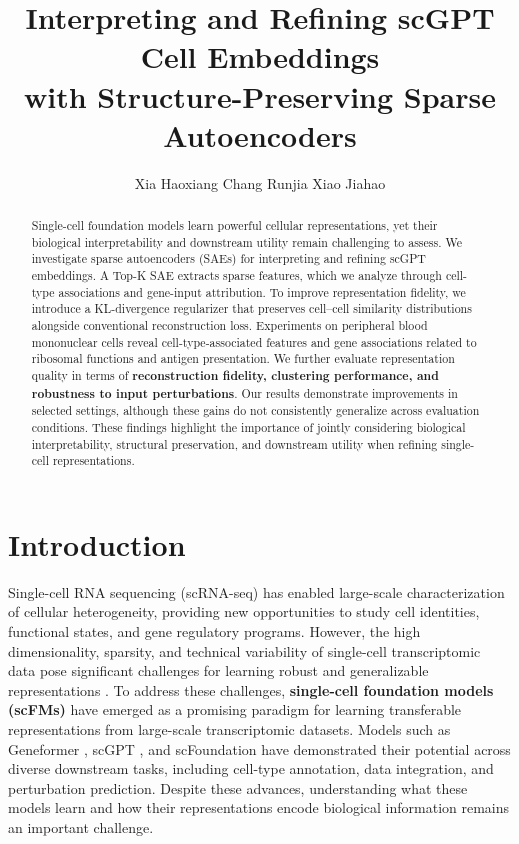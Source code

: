 \documentclass{article}
\title{Interpreting and Refining scGPT Cell Embeddings\\
with Structure-Preserving Sparse Autoencoders}
\author{Xia Haoxiang \And Chang Runjia \And Xiao Jiahao}
\begin{document}
\maketitle
\thispagestyle{plain}

\begin{abstract}
Single-cell foundation models learn powerful cellular representations, yet their biological interpretability and downstream utility remain challenging to assess. We investigate sparse autoencoders (SAEs) for interpreting and refining scGPT embeddings. A Top-K SAE extracts sparse features, which we analyze through cell-type associations and gene-input attribution. To improve representation fidelity, we introduce a KL-divergence regularizer that preserves cell--cell similarity distributions alongside conventional reconstruction loss. Experiments on peripheral blood mononuclear cells reveal cell-type-associated features and gene associations related to ribosomal functions and antigen presentation. We further evaluate representation quality in terms of \textbf{reconstruction fidelity, clustering performance, and robustness to input perturbations}. Our results demonstrate improvements in selected settings, although these gains do not consistently generalize across evaluation conditions. These findings highlight the importance of jointly considering biological interpretability, structural preservation, and downstream utility when refining single-cell representations.
\end{abstract}

\section{Introduction}
\label{sec:introduction}

Single-cell RNA sequencing (scRNA-seq) has enabled large-scale characterization of cellular heterogeneity, providing new opportunities to study cell identities, functional states, and gene regulatory programs. However, the high dimensionality, sparsity, and technical variability of single-cell transcriptomic data pose significant challenges for learning robust and generalizable representations \citep{luecken2019}. To address these challenges, \textbf{single-cell foundation models (scFMs)} have emerged as a promising paradigm for learning transferable representations from large-scale transcriptomic datasets. Models such as Geneformer \citep{theodoris2023}, scGPT \citep{cui2024}, and scFoundation \citep{hao2024} have demonstrated their potential across diverse downstream tasks, including cell-type annotation, data integration, and perturbation prediction. Despite these advances, understanding what these models learn and how their representations encode biological information remains an important challenge.
\end{document}
